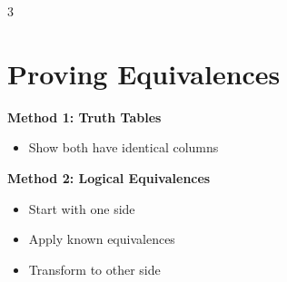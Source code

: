 \documentclass[8pt]{article}
\theoremstyle{definition}
\begin{document}
\begin{multicols}{3}
\section*{Proving Equivalences}
\textbf{Method 1: Truth Tables}
\begin{itemize}[nosep]
\item Show both have identical columns
\end{itemize}

\textbf{Method 2: Logical Equivalences}
\begin{itemize}[nosep]
\item Start with one side
\item Apply known equivalences
\item Transform to other side
\end{itemize}
\end{multicols}
\end{document}
